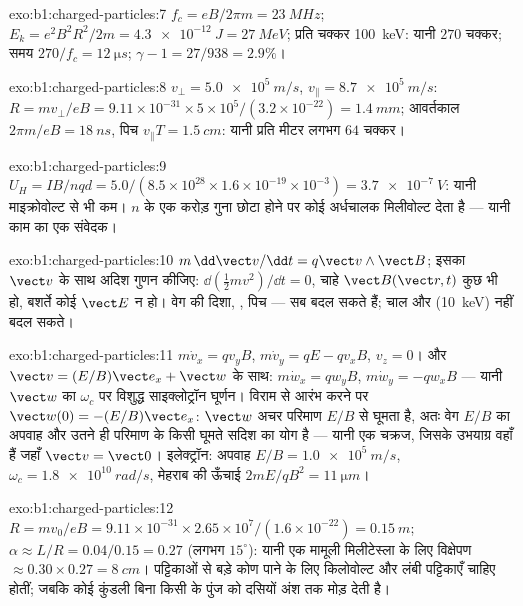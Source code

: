 \begin{solution}{exo:b1:charged-particles:7}
$f_c = eB/2\pi m = \qty{23}{MHz}$; $E_k = e^2B^2R^2/2m = \qty{4.3e-12}{J} =
\qty{27}{MeV}$; प्रति चक्कर \qty{100}{keV}: यानी $270$ चक्कर; समय $270/f_c =
\qty{12}{\micro s}$; $\gamma - 1 = 27/938 = 2.9\%$।
\end{solution}

\begin{solution}{exo:b1:charged-particles:8}
$v_\perp = \qty{5.0e5}{m/s}$, $v_\parallel = \qty{8.7e5}{m/s}$: $R = mv_\perp/eB
= 9.11\times10^{-31} \times 5\times10^5/(3.2\times10^{-22}) = \qty{1.4}{mm}$;
आवर्तकाल $2\pi m/eB = \qty{18}{ns}$, पिच $v_\parallel T = \qty{1.5}{cm}$:
यानी प्रति मीटर लगभग $64$ चक्कर।
\end{solution}

\begin{solution}{exo:b1:charged-particles:9}
$U_H = IB/nqd = 5.0/(8.5\times10^{28} \times 1.6\times10^{-19} \times 10^{-3})
= \qty{3.7e-7}{V}$: यानी माइक्रोवोल्ट से भी कम। $n$ के एक करोड़ गुना छोटा
होने पर कोई अर्धचालक मिलीवोल्ट देता है --- यानी काम का एक संवेदक।
\end{solution}

\begin{solution}{exo:b1:charged-particles:10}
$m\,\dd\vect v/\dd t = q\vect v\wedge\vect B$; इसका $\vect v$ के साथ अदिश गुणन
कीजिए: $\dd(\tfrac12 mv^2)/
\dd t = 0$, चाहे $\vect B(\vect r, t)$ कुछ भी हो, बशर्ते कोई $\vect E$ न हो।
वेग की दिशा, , पिच --- सब बदल सकते हैं; चाल और 
(\qty{10}{keV}) नहीं बदल सकते।
\end{solution}

\begin{solution}{exo:b1:charged-particles:11}
$m\dot v_x = qv_yB$, $m\dot v_y = qE - qv_xB$, $v_z = 0$। और $\vect v =
(E/B)\vect e_x + \vect w$ के साथ: $m\dot w_x = qw_yB$, $m\dot w_y = -qw_xB$ ---
यानी $\vect w$ का $\omega_c$ पर विशुद्ध साइक्लोट्रॉन घूर्णन। विराम से आरंभ
करने पर $\vect w(0) = -(E/B)\vect e_x$: $\vect w$ अचर परिमाण $E/B$ से घूमता
है, अतः वेग $E/B$ का अपवाह और उतने ही परिमाण के किसी घूमते सदिश का योग है
--- यानी एक चक्रज, जिसके उभयाग्र वहाँ हैं जहाँ $\vect v = \vect 0$।
इलेक्ट्रॉन: अपवाह $E/B =
\qty{1.0e5}{m/s}$, $\omega_c = \qty{1.8e10}{rad/s}$, मेहराब की ऊँचाई $2mE/qB^2 =
\qty{11}{\micro m}$।
\end{solution}

\begin{solution}{exo:b1:charged-particles:12}
$R = mv_0/eB = 9.11\times10^{-31} \times 2.65\times10^7/(1.6\times10^{-22}) =
\qty{0.15}{m}$; $\alpha \approx L/R = 0.04/0.15 = 0.27$ (लगभग $15^\circ$):
यानी एक मामूली मिलीटेस्ला के लिए विक्षेपण
$\approx 0.30 \times 0.27 = \qty{8}{cm}$। पट्टिकाओं से बड़े कोण पाने के लिए
किलोवोल्ट और लंबी पट्टिकाएँ चाहिए होतीं; जबकि कोई कुंडली बिना किसी
 के पुंज को दसियों अंश तक मोड़ देती है।
\end{solution}

